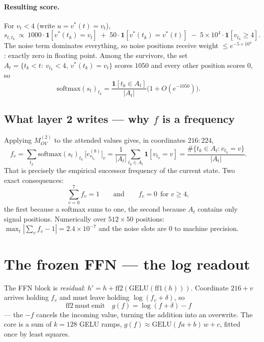 \documentclass[11pt]{article}
\begin{document}
\paragraph{Resulting score.} For $v_t<4$ (write $u=v^*(t)=v_t$),
\begin{equation}
s_{t,t_k}\ \propto\ 1000\cdot\bm{1}[v^*(t_k)=v_t]\;+\;50\cdot\bm{1}[v^*(t_k)=v^*(t)]
\;-\;5\times10^{4}\cdot\bm{1}[v_{t_k}\ge4].
\end{equation}
The noise term dominates everything, so noise positions receive weight
$\le e^{-5\times10^4}$: exactly zero in floating point. Among the survivors, the set
$A_t=\{t_k<t:\ v_{t_k}<4,\ v^*(t_k)=v_t\}$ scores $1050$ and every other position scores $0$, so
\begin{equation}
\mathrm{softmax}(s_t)_{t_k}=\frac{\bm{1}[t_k\in A_t]}{|A_t|}\bigl(1+O(e^{-1050})\bigr).
\end{equation}

\subsection{What layer 2 writes --- why $f$ is a frequency}
Applying $M^{(2)}_{OV}$ to the attended values gives, in coordinates $216{:}224$,
\begin{equation}
f_v=\sum_{t_k}\mathrm{softmax}(s_t)_{t_k}\,\bigl[e^{(8)}_{v_{t_k}}\bigr]_v
=\frac{1}{|A_t|}\sum_{t_k\in A_t}\bm{1}[v_{t_k}=v]
=\frac{\#\{t_k\in A_t: v_{t_k}=v\}}{|A_t|}.
\end{equation}
That is precisely the empirical successor frequency of the current state. Two exact consequences:
\begin{equation}
\boxed{\sum_{v=0}^{7}f_v=1}\qquad\text{and}\qquad \boxed{f_v=0\ \ \text{for }v\ge4},
\end{equation}
the first because a softmax sums to one, the second because $A_t$ contains only signal positions.
Numerically over $512\times50$ positions: $\max_t|\sum_v f_v-1|=2.4\times10^{-7}$ and the noise
slots are $0$ to machine precision.

\section{The frozen FFN --- the log readout}

The FFN block is \emph{residual}: $h'=h+\mathrm{ff2}(\mathrm{GELU}(\mathrm{ff1}(h)))$. Coordinate
$216{+}v$ arrives holding $f_v$ and must leave holding $\log(f_v+\delta)$, so
\begin{equation}
\boxed{\ \mathrm{ff2\ must\ emit}\quad g(f)=\log(f+\delta)-f\ }
\end{equation}
--- the $-f$ cancels the incoming value, turning the addition into an overwrite. The core is a
sum of $k=128$ GELU ramps, $g(f)\approx\mathrm{GELU}(fa+b)\,w+c$, fitted once by least squares.
\end{document}

